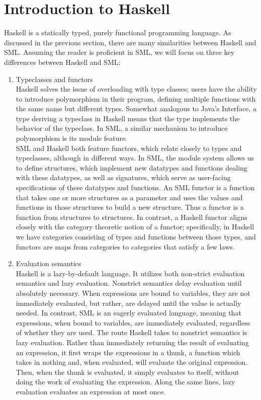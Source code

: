 \documentclass[journal]{IEEEtran}
\begin{document}
\section{Introduction to Haskell}
Haskell is a statically typed, purely functional programming language. As discussed in the previous section, there are many similarities between Haskell and SML. Assuming the reader is proficient in SML, we will focus on three key differences between Haskell and SML: \\

\begin{enumerate}
\item Typeclasses and functors\\

Haskell solves the issue of overloading with type classes; users have the ability to introduce polymorphism in their program, defining multiple functions with the same name but different types. Somewhat analogous to Java's Interface, a type deriving a typeclass in Haskell means that the type implements the behavior of the typeclass. In SML, a similar mechanism to introduce polymorphism is its module feature. \\

SML and Haskell both feature functors, which relate closely to types and typeclasses, although in different ways. In SML, the module system allows us to define structures, which implement new datatypes and functions dealing with these datatypes, as well as signatures, which serve as user-facing specifications of these datatypes and functions. An SML functor is a function that takes one or more structures as a parameter and uses the values and functions in those structures to build a new structure. Thus a functor is a function from structures to structures. In contrast, a Haskell functor aligns closely with the category theoretic notion of a functor; specifically, in Haskell we have categories consisting of types and functions between those types, and functors are maps from categories to categories that satisfy a few laws. \\

\item Evaluation semantics \\

Haskell is a lazy-by-default language. It utilizes both non-strict evaluation semantics and lazy evaluation. Nonstrict semantics delay evaluation until absolutely necessary. When expressions are bound to variables, they are not immediately evaluated, but rather, are delayed until the value is actually needed. In contrast, SML is an eagerly evaluated language, meaning that expressions, when bound to variables, are immediately evaluated, regardless of whether they are used. The route Haskell takes to nonstrict semantics is lazy evaluation. Rather than immediately returning the result of evaluating an expression, it first wraps the  expressions in a thunk, a function which takes in nothing and, when evaluated, will evaluate the original expression. Then, when the thunk is evaluated, it simply evaluates to itself, without doing the work of evaluating the expression. Along the same lines, lazy evaluation evaluates an expression at most once. \\


\end{enumerate}
\end{document}
